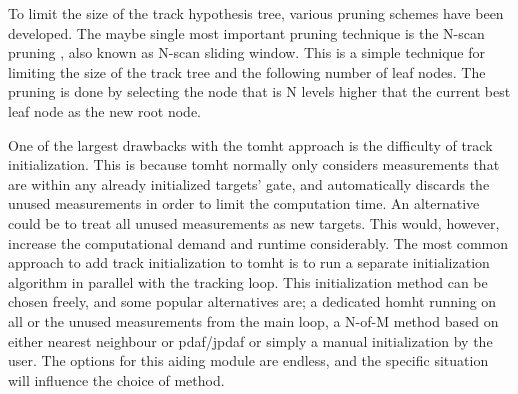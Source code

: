 To limit the size of the \gls{track hypothesis tree}, various pruning schemes have been developed. The maybe single most important pruning technique is the N-scan pruning \cite{Blackman2001}, also known as N-scan sliding window. This is a simple technique for limiting the size of the track tree and the following number of leaf nodes. The pruning is done by selecting the node that is N levels higher that the current best leaf node as the new root node.

One of the largest drawbacks with the \gls{tomht} approach is the difficulty of track initialization. This is because \gls{tomht} normally only considers \glspl{measurement} that are within any already initialized \glspl{target}' \gls{gate}, and automatically discards the unused \glspl{measurement} in order to limit the computation time. An alternative could be to treat all unused measurements as new targets. This would, however, increase the computational demand and runtime considerably. The most common approach to add track initialization to \gls{tomht} is to run a separate initialization algorithm in parallel with the tracking loop. This initialization method can be chosen freely, and some popular alternatives are; a dedicated \gls{homht} running on all or the unused \glspl{measurement} from the main loop, a N-of-M method based on either nearest neighbour or \gls{pdaf}/\gls{jpdaf} or simply a manual initialization by the user. The options for this aiding module are endless, and the specific situation will influence the choice of method.
